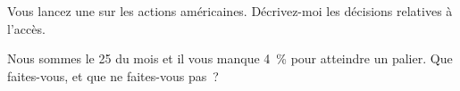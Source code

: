 \begin{interviewq}\label{iq:m1:getting-access-equities:5}
Vous lancez une  sur les actions américaines. Décrivez-moi
les décisions relatives à l'accès.
\end{interviewq}

\begin{interviewq}\label{iq:m1:getting-access-equities:6}
Nous sommes le 25 du mois et il vous manque 4~\% pour atteindre un palier. Que faites-vous,
et que ne faites-vous pas~?
\end{interviewq}
